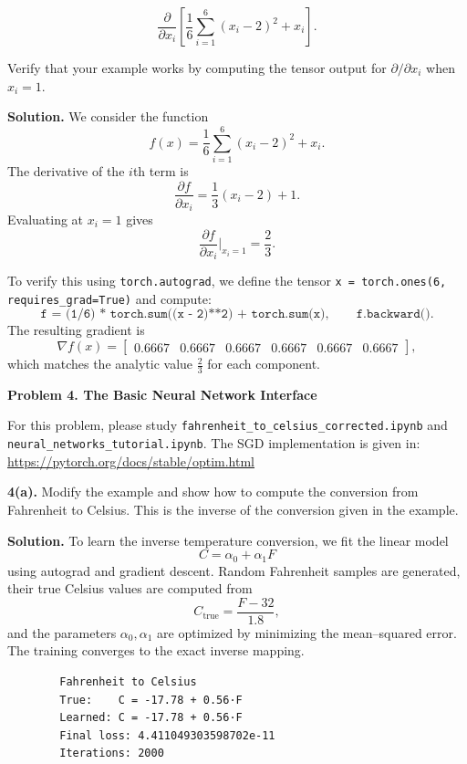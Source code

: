 \documentclass[11pt]{article}
\begin{document}
	\[
	\frac{\partial}{\partial x_i}
	\left[
	\frac{1}{6}
	\sum_{i=1}^{6} (x_i - 2)^2 + x_i
	\right].
	\]
	
	Verify that your example works by computing the tensor output for
	\(\partial / \partial x_i\) when \(x_i = 1\).
	
	\noindent\textbf{Solution.}
	We consider the function
	\[
	f(x) = \frac{1}{6}\sum_{i=1}^{6}(x_i - 2)^2 + x_i.
	\]
	The derivative of the $i$th term is
	\[
	\frac{\partial f}{\partial x_i}
	= \frac{1}{3}(x_i - 2) + 1.
	\]
	Evaluating at $x_i = 1$ gives
	\[
	\frac{\partial f}{\partial x_i}\bigg|_{x_i=1} = \frac{2}{3}.
	\]
	
	To verify this using \texttt{torch.autograd}, we define the tensor 
	\texttt{x = torch.ones(6, requires\_grad=True)} and compute:
	\[
	\texttt{f = (1/6) * torch.sum((x - 2)**2) + torch.sum(x)}, \qquad
	\texttt{f.backward()}.
	\]
	The resulting gradient is
	\[
	\nabla f(x) = 
	\begin{bmatrix}
		0.6667 & 0.6667 & 0.6667 & 0.6667 & 0.6667 & 0.6667
	\end{bmatrix},
	\]
	which matches the analytic value $\frac{2}{3}$ for each component.
	
	\newpage
	
	\vspace{0.5em}
	\noindent\textbf{Problem 4. The Basic Neural Network Interface}
	
	For this problem, please study \texttt{fahrenheit\_to\_celsius\_corrected.ipynb} and\\ \texttt{neural\_networks\_tutorial.ipynb}. The SGD implementation is given in:\\
	\url{https://pytorch.org/docs/stable/optim.html}
	
	\vspace{0.5em}
	\noindent\textbf{4(a).} Modify the example and show how to compute the conversion
	from Fahrenheit to Celsius. This is the inverse of the conversion given in the example.
	
	\noindent\textbf{Solution.}
	To learn the inverse temperature conversion, we fit the linear model
	\[
	C = \alpha_0 + \alpha_1 F
	\]
	using autograd and gradient descent. Random Fahrenheit samples are generated,
	their true Celsius values are computed from
	\[
	C_{\text{true}} = \frac{F - 32}{1.8},
	\]
	and the parameters \(\alpha_0,\alpha_1\) are optimized by minimizing the 
	mean–squared error. The training converges to the exact inverse mapping.
	
	\begin{verbatim}
		Fahrenheit to Celsius
		True:    C = -17.78 + 0.56·F
		Learned: C = -17.78 + 0.56·F
		Final loss: 4.411049303598702e-11
		Iterations: 2000
	\end{verbatim}
	
\end{document}
